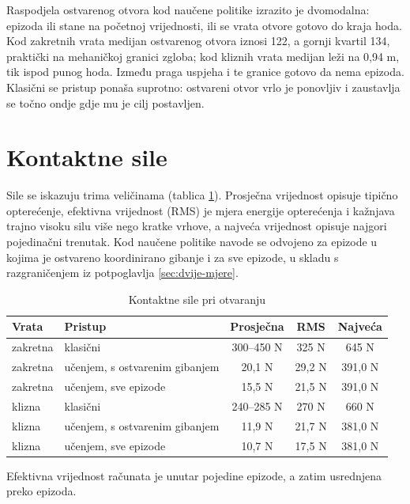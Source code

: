 Raspodjela ostvarenog otvora kod naučene politike izrazito je dvomodalna: epizoda ili stane na
početnoj vrijednosti, ili se vrata otvore gotovo do kraja hoda. Kod zakretnih vrata medijan
ostvarenog otvora iznosi 122\textdegree{}, a gornji kvartil 134\textdegree{}, praktički na
mehaničkoj granici zgloba; kod kliznih vrata medijan leži na 0,94 m, tik ispod punog hoda.
Između praga uspjeha i te granice gotovo da nema epizoda. Klasični se pristup ponaša suprotno:
ostvareni otvor vrlo je ponovljiv i zaustavlja se točno ondje gdje mu je cilj postavljen.

\section{Kontaktne sile}
\label{sec:usporedba-sile}

Sile se iskazuju trima veličinama (tablica \ref{tab:usporedba-sile}). Prosječna vrijednost opisuje
tipično opterećenje, efektivna vrijednost (RMS) je mjera energije opterećenja i kažnjava trajno visoku
silu više nego kratke vrhove, a najveća vrijednost opisuje najgori pojedinačni trenutak. Kod naučene
politike navode se odvojeno za epizode u kojima je ostvareno koordinirano gibanje i za sve epizode,
u skladu s razgraničenjem iz potpoglavlja \ref{sec:dvije-mjere}.

\begin{table}[H]
      \centering
      \caption{Kontaktne sile pri otvaranju}
      \label{tab:usporedba-sile}
      \begin{tabular}{@{}llccc@{}}
            \toprule
            Vrata    & Pristup                        & Prosječna  & RMS    & Najveća \\
            \midrule
            zakretna & klasični                       & 300--450 N & 325 N  & 645 N   \\
            zakretna & učenjem, s ostvarenim gibanjem & 20,1 N     & 29,2 N & 391,0 N \\
            zakretna & učenjem, sve epizode           & 15,5 N     & 21,5 N & 391,0 N \\
            \midrule
            klizna   & klasični                       & 240--285 N & 270 N  & 660 N   \\
            klizna   & učenjem, s ostvarenim gibanjem & 11,9 N     & 21,7 N & 381,0 N \\
            klizna   & učenjem, sve epizode           & 10,7 N     & 17,5 N & 381,0 N \\
            \bottomrule
      \end{tabular}

      \vspace{2mm}
      {\footnotesize Efektivna vrijednost računata je unutar pojedine epizode, a zatim usrednjena
            preko epizoda.}
\end{table}

